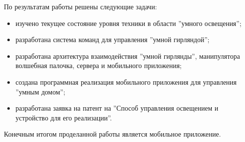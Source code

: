 \Conclusion %

По результатам работы решены следующие задачи:

\begin{itemize}
	\item изучено текущее состояние уровня техники в области ''умного освещения'';  
    \item разработана система команд для управления ''умной гирляндой''; 
    \item разработана архитектура взаимодействия ''умной гирлянды'', манипулятора волшебная палочка, сервера и мобильного приложения;
    \item  создана программная реализация мобильного приложения для управления ''умным домом'';
    \item  разработана заявка на патент на ''Способ управления освещением и устройство для его реализации''.
\end{itemize}

Конечным итогом проделанной работы является мобильное приложение.  

